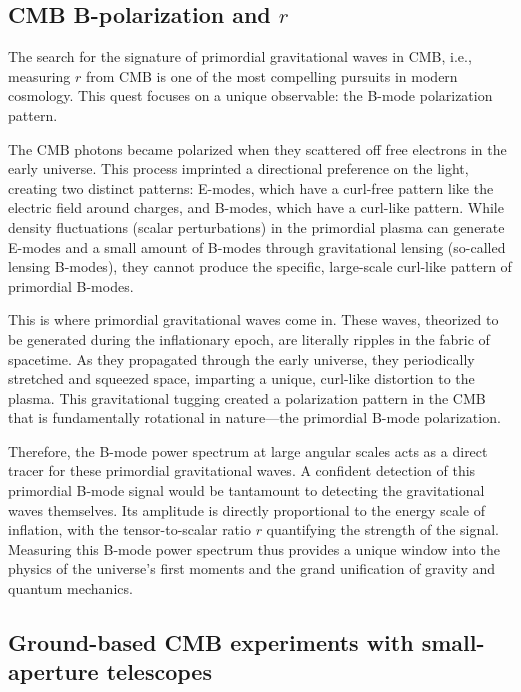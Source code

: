 \documentclass[12pt, a4paper]{ctexart} %
\begin{document}
\subsection{CMB B-polarization and $r$}

The search for the signature of primordial gravitational waves in CMB, i.e., measuring $r$ from CMB is one of the most compelling pursuits in modern cosmology. This quest focuses on a unique observable: the B-mode polarization pattern.

The CMB photons became polarized when they scattered off free electrons in the early universe. This process imprinted a directional preference on the light, creating two distinct patterns: E-modes, which have a curl-free pattern like the electric field around charges, and B-modes, which have a curl-like pattern. While density fluctuations (scalar perturbations) in the primordial plasma can generate E-modes and a small amount of B-modes through gravitational lensing (so-called lensing B-modes), they cannot produce the specific, large-scale curl-like pattern of primordial B-modes.

This is where primordial gravitational waves come in. These waves, theorized to be generated during the inflationary epoch, are literally ripples in the fabric of spacetime. As they propagated through the early universe, they periodically stretched and squeezed space, imparting a unique, curl-like distortion to the plasma. This gravitational tugging created a polarization pattern in the CMB that is fundamentally rotational in nature—the primordial B-mode polarization.

Therefore, the B-mode power spectrum at large angular scales acts as a direct tracer for these primordial gravitational waves. A confident detection of this primordial B-mode signal would be tantamount to detecting the gravitational waves themselves. Its amplitude is directly proportional to the energy scale of inflation, with the tensor-to-scalar ratio $r$ quantifying the strength of the signal. Measuring this B-mode power spectrum thus provides a unique window into the physics of the universe's first moments and the grand unification of gravity and quantum mechanics.

\subsection{Ground-based CMB experiments with small-aperture telescopes}
\end{document}
